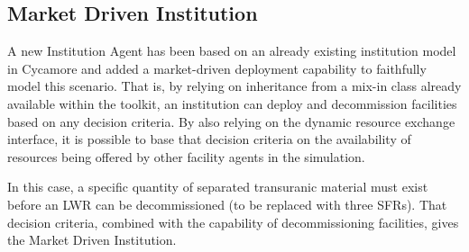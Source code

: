 
\subsection{Market Driven Institution}
\label{sec:mktdriveninst}
A new Institution Agent has been based on an already existing institution
model in Cycamore and added a market-driven deployment capability to faithfully 
model this scenario.  That is, by relying on inheritance from a mix-in class 
already available within the \Cyclus toolkit, an institution can deploy and 
decommission facilities based on any decision criteria. By also relying on the 
dynamic resource exchange interface, it is possible to base that decision 
criteria on the availability of resources being offered by other facility 
agents in the simulation. 

In this case, a specific quantity of separated transuranic material must exist 
before an \gls{LWR} can be decommissioned (to be replaced with three \glspl{SFR}). That 
decision criteria, combined with the capability of decommissioning facilities, 
gives the Market Driven Institution. 


